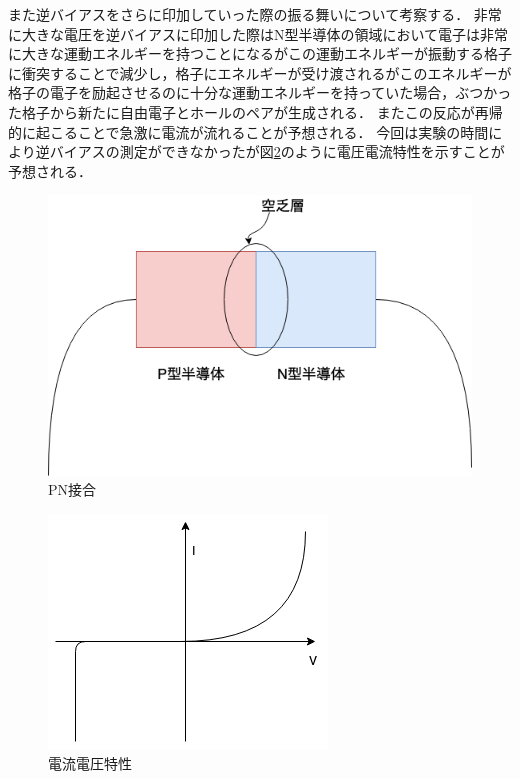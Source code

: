 \documentclass[11pt, a4paper,twocolumn]{jarticle}
\begin{document}
また逆バイアスをさらに印加していった際の振る舞いについて考察する．
非常に大きな電圧を逆バイアスに印加した際はN型半導体の領域において電子は非常に大きな運動エネルギーを持つことになるがこの運動エネルギーが振動する格子に衝突することで減少し，格子にエネルギーが受け渡されるがこのエネルギーが格子の電子を励起させるのに十分な運動エネルギーを持っていた場合，ぶつかった格子から新たに自由電子とホールのペアが生成される．
またこの反応が再帰的に起こることで急激に電流が流れることが予想される．
今回は実験の時間により逆バイアスの測定ができなかったが図\ref{fig:37}のように電圧電流特性を示すことが予想される．



\begin{figure}[htbp]
 \begin{center}
  \includegraphics[width=0.8\linewidth]{fig36.png}
 \end{center}
 \caption{PN接合}
 \label{fig:36}
\end{figure}

\begin{figure}[htbp]
 \begin{center}
  \includegraphics[width=0.8\linewidth]{fig37.png}
 \end{center}
 \caption{電流電圧特性}
 \label{fig:37}
\end{figure}


\newpage
\end{document}
